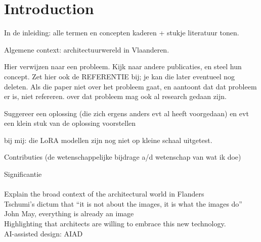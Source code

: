 \chapter{Introduction}
In de inleiding: alle termen en concepten kaderen + stukje literatuur tonen.

Algemene context: architectuurwereld in Vlaanderen.

Hier verwijzen naar een probleem. Kijk naar andere publicaties, en steel hun concept. Zet hier ook de REFERENTIE bij; je kan die later eventueel nog deleten.
Als die paper niet over het probleem gaat, en aantoont dat dat probleem er is, niet refereren.
over dat probleem mag ook al research gedaan zijn.

Suggereer een oplossing (die zich ergens anders evt al heeft voorgedaan) 
en evt een klein stuk van de oplossing voorstellen

bij mij: die LoRA modellen zijn nog niet op kleine schaal uitgetest.

Contributies (de wetenschappelijke bijdrage a/d wetenschap van wat ik doe)

Significantie \\
\\
Explain the broad context of the architectural world in Flanders
\\
Tschumi’s dictum that “it is not about the images, it is what the images do”
\\
John May, everything is already an image
\\
Highlighting that architects are willing to embrace this new technology.
\\
AI-assisted design: AIAD
\\
